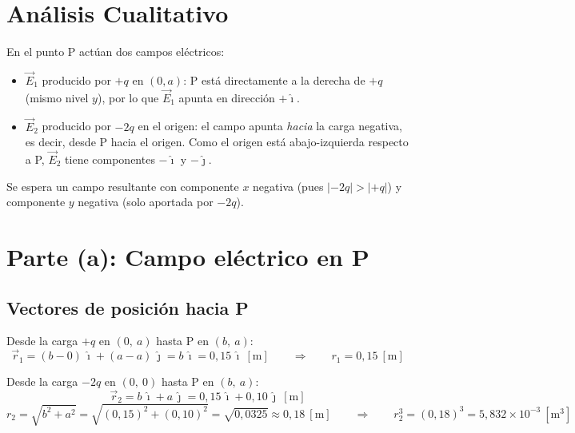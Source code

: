 \documentclass[12pt,letterpaper]{article}
\begin{document}
\section*{An\'alisis Cualitativo}

En el punto P act\'uan dos campos el\'ectricos:

\begin{itemize}
    \item $\vec{E}_1$ producido por $+q$ en $(0,a)$: P est\'a directamente a la derecha
    de $+q$ (mismo nivel $y$), por lo que $\vec{E}_1$ apunta en direcci\'on $+\hat{\imath}$.

    \item $\vec{E}_2$ producido por $-2q$ en el origen: el campo apunta \textit{hacia}
    la carga negativa, es decir, desde P hacia el origen. Como el origen est\'a
    abajo-izquierda respecto a P, $\vec{E}_2$ tiene componentes $-\hat{\imath}$
    y $-\hat{\jmath}$.
\end{itemize}

Se espera un campo resultante con componente $x$ negativa (pues $|-2q| > |{+q}|$)
y componente $y$ negativa (solo aportada por $-2q$).

\section*{Parte (a): Campo el\'ectrico en P}

\subsection*{Vectores de posici\'on hacia P}

Desde la carga $+q$ en $(0,\ a)$ hasta P en $(b,\ a)$:
\[
    \vec{r}_1 = (b-0)\,\hat{\imath} + (a-a)\,\hat{\jmath} = b\,\hat{\imath}
    = 0{,}15\,\hat{\imath}\ [\text{m}]
    \qquad \Rightarrow \qquad r_1 = 0{,}15\ [\text{m}]
\]

Desde la carga $-2q$ en $(0,\ 0)$ hasta P en $(b,\ a)$:
\[
    \vec{r}_2 = b\,\hat{\imath} + a\,\hat{\jmath}
    = 0{,}15\,\hat{\imath} + 0{,}10\,\hat{\jmath}\ [\text{m}]
\]
\[
    r_2 = \sqrt{b^2 + a^2} = \sqrt{(0{,}15)^2 + (0{,}10)^2}
    = \sqrt{0{,}0325} \approx 0{,}18\ [\text{m}]
    \qquad \Rightarrow \qquad r_2^3 = (0{,}18)^3 = 5{,}832\times10^{-3}\ [\text{m}^3]
\]
\end{document}
